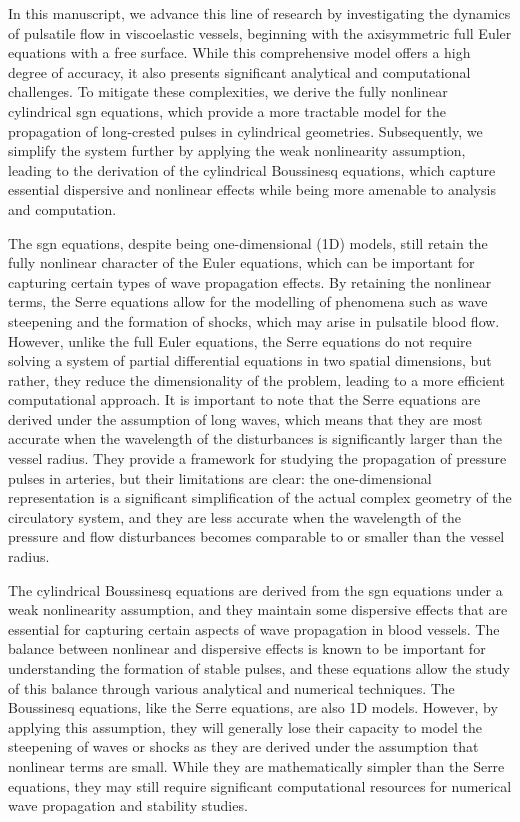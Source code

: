 \documentclass[alpha-refs, 12pt]{wiley-article}
\begin{document}
In this manuscript, we advance this line of research by investigating the dynamics of pulsatile flow in viscoelastic vessels, beginning with the axisymmetric full Euler equations with a free surface. While this comprehensive model offers a high degree of accuracy, it also presents significant analytical and computational challenges. To mitigate these complexities, we derive the fully nonlinear cylindrical \acrfull{sgn} equations, which provide a more tractable model for the propagation of long-crested pulses in cylindrical geometries. Subsequently, we simplify the system further by applying the weak nonlinearity assumption, leading to the derivation of the cylindrical Boussinesq equations, which capture essential dispersive and nonlinear effects while being more amenable to analysis and computation.

The \acrshort{sgn} equations, despite being one-dimensional (1D) models, still retain the fully nonlinear character of the Euler equations, which can be important for capturing certain types of wave propagation effects. By retaining the nonlinear terms, the Serre equations allow for the modelling of phenomena such as wave steepening and the formation of shocks, which may arise in pulsatile blood flow. However, unlike the full Euler equations, the Serre equations do not require solving a system of partial differential equations in two spatial dimensions, but rather, they reduce the dimensionality of the problem, leading to a more efficient computational approach. It is important to note that the Serre equations are derived under the assumption of long waves, which means that they are most accurate when the wavelength of the disturbances is significantly larger than the vessel radius. They provide a framework for studying the propagation of pressure pulses in arteries, but their limitations are clear: the one-dimensional representation is a significant simplification of the actual complex geometry of the circulatory system, and they are less accurate when the wavelength of the pressure and flow disturbances becomes comparable to or smaller than the vessel radius.

The cylindrical Boussinesq equations are derived from the \acrshort{sgn} equations under a weak nonlinearity assumption, and they maintain some dispersive effects that are essential for capturing certain aspects of wave propagation in blood vessels. The balance between nonlinear and dispersive effects is known to be important for understanding the formation of stable pulses, and these equations allow the study of this balance through various analytical and numerical techniques. The Boussinesq equations, like the Serre equations, are also 1D models. However, by applying this assumption, they will generally lose their capacity to model the steepening of waves or shocks as they are derived under the assumption that nonlinear terms are small. While they are mathematically simpler than the Serre equations, they may still require significant computational resources for numerical wave propagation and stability studies.
\end{document}
